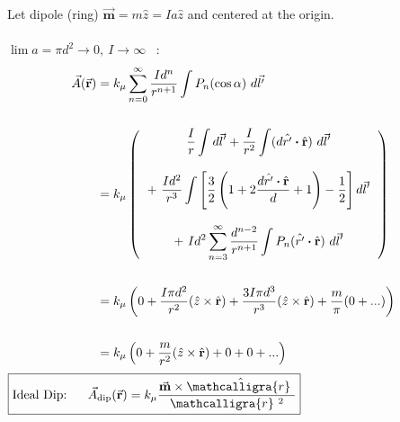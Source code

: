 \documentclass[12pt]{article}
\newcommand*{\bfr}{\mathbf{r}}
\newcommand{\scripty}[1]{\ensuremath{\mathcalligra{#1}}}
\newcommand*{\cursrr}{\scripty{r}\ }
\newcommand*{\dotP}{\boldsymbol \cdot}		%
\begin{document}
\begin{minipage}[t]{0.5\textwidth}
	Let dipole (ring) \( \vec{ \mathbf{m} } = m \hat{z} = Ia \hat{z} \) and centered at the origin. \\ \\
	\(\lim a = \pi d^2 \rightarrow 0, \ I \rightarrow \infty \) \ :
	\begin{align*}
		\vec{A}( \vec{ \mathbf{r} } ) &= k_\mu \sum_{n=0}^\infty 
			\frac{Id^n}{r^{n+1}} \int P_n (\cos{\alpha}) \ d\vec{l'}\\ \\
		&= k_\mu \left( 
				\begin{tabular}{c}
					\( \displaystyle \frac{I}{r} \int d\vec{l}' 
						+ \frac{I}{r^2} \int ( d \hat{r'} \dotP \hat{\bfr} ) \ d\vec{l}' \) \\ \\
					\( \displaystyle + \ \frac{Id^2}{r^3} \int 
						\left[ \frac{3}{2} \left( 1 + 2 \frac{d \hat{r'} \dotP \hat{\bfr}}{d} + 1 \right) 
						- \frac{1}{2} \right] d\vec{l}' \) \\ \\ 
					\( \displaystyle + \ I d^2 \sum_{n=3}^\infty \frac{d^{n-2}}{r^{n+1}} \int P_n (\hat{r'} \dotP \hat{\bfr}) \ d\vec{l}' \)	
				\end{tabular} 
			\right) \\ \\
		&= k_\mu \left( 0
			+ \frac{I \pi d^2}{r^2} ( \hat{z} \times \hat{\bfr} )
			+ \frac{3 I \pi d^3}{r^3} ( \hat{z} \times \hat{\bfr} )
			+ \frac{m}{\pi} (0 + ...) \right)\\ \\
		&= k_\mu \left( 0
			+ \frac{m}{r^2} ( \hat{z} \times \hat{\bfr} )
			+ 0 + 0 + ... \right)
	\end{align*}
	\hfill \break
	\( \boxed{ \text{Ideal Dip:} \ \ \ \ \ \vec{A}_{ \text{dip} }( \vec{ \mathbf{r} } ) 
		= k_\mu \frac{ \vec{ \mathbf{m} } \times \hat{\cursrr} }{\cursrr^{2}} } \)
\end{minipage}

\end{document}
